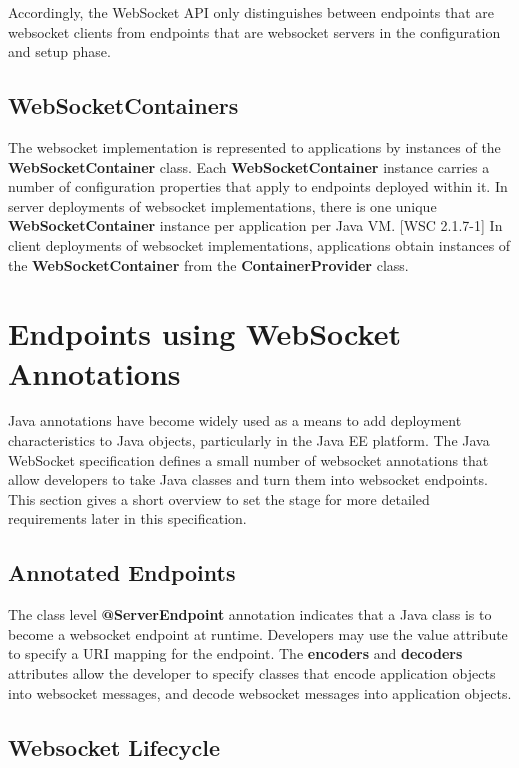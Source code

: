Accordingly, the WebSocket API only distinguishes between endpoints that are websocket clients from endpoints that are websocket servers in the configuration and setup phase.

\subsection{WebSocketContainers}

The websocket implementation is represented to applications by instances of the \textbf{WebSocketContainer} class. Each \textbf{WebSocketContainer} instance carries a number of configuration properties that apply to endpoints deployed within it. In server deployments of websocket implementations, there is one unique \textbf{WebSocketContainer} instance per application per Java VM. [WSC 2.1.7-1] In client deployments of websocket implementations, applications obtain instances of the \textbf{WebSocketContainer} from the \textbf{ContainerProvider} class.

\section{Endpoints using WebSocket Annotations}

Java annotations have become widely used as a means to add deployment characteristics to Java objects, particularly in the Java EE platform. The Java WebSocket specification defines a small number of websocket annotations that allow developers to take Java classes and turn them into websocket endpoints. This section gives a short overview to set the stage for more detailed requirements later in this specification.

\subsection{Annotated Endpoints}

The class level \textbf{@ServerEndpoint} annotation indicates that a Java class is to become a websocket endpoint at runtime. Developers may use the value attribute to specify a URI mapping for the endpoint. The \textbf{encoders} and \textbf{decoders} attributes allow the developer to specify classes that encode application objects into websocket messages, and decode websocket messages into application objects.

\subsection{Websocket Lifecycle}

